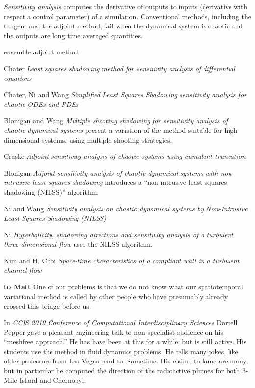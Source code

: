 \begin{description}
\emph{Sensitivity analysis} computes the derivative of outputs to inputs
(derivative with respect a control parameter) of a
simulation. Conventional methods, including the tangent and the adjoint method,
fail when the dynamical system is chaotic and the outputs are long time averaged
quantities.

ensemble adjoint method


Chater \etal{} {\em Least squares shadowing method for sensitivity
analysis of differential equations}

Chater, Ni and Wang {\em Simplified {Least Squares Shadowing}
sensitivity analysis for chaotic {ODEs} and {PDEs}}

Blonigan and Wang {\em Multiple shooting shadowing for sensitivity
analysis of chaotic dynamical systems} present a variation of the method suitable
for high-dimensional systems, using multiple-shooting strategies.

Craske
{\em Adjoint sensitivity analysis of chaotic systems using cumulant truncation}

Blonigan {\em Adjoint sensitivity analysis of chaotic dynamical
systems with non-intrusive least squares shadowing} introduces a ``non-intrusive
least-squares shadowing (NILSS)'' algorithm.

Ni and Wang {\em Sensitivity analysis on chaotic dynamical systems by
{Non-Intrusive Least Squares Shadowing ({NILSS})}}

Ni {\em Hyperbolicity, shadowing directions and sensitivity analysis of
a turbulent three-dimensional flow} uses the NILSS algorithm.

Kim and H. Choi
{\em Space-time characteristics of a compliant wall in a turbulent channel flow}

 { {\bf to Matt}
One of our problems is that we do not know what our spatiotemporal
variational method is called by other people who have presumably already
crossed this bridge before us.

In  {\em CCIS 2019}
{\em Conference of Computational Interdisciplinary Sciences}
 {Darrell Pepper}
gave a pleasant engineering talk to non-specialist audience on his
``meshfree approach.''
He has have been at this for a while, but is still active. His students
use the method in fluid dynamics problems. He tells many jokes, like
older professors from Las Vegas tend to. Sometime. His claims to fame are many, but in
particular he computed the direction of the radioactive plumes for both
3-Mile Island and Chernobyl.

}
\end{description}
